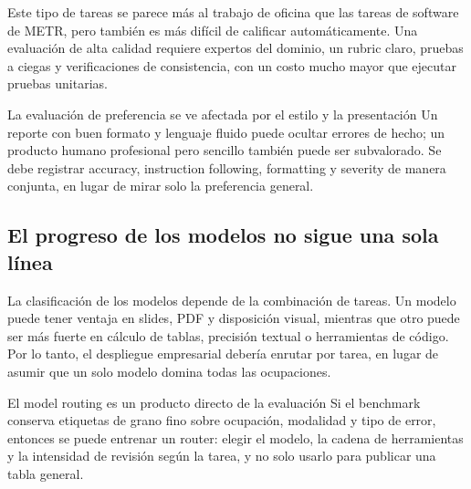 
Este tipo de tareas se parece más al trabajo de oficina que las tareas de software de METR, pero también es más difícil de calificar automáticamente. Una evaluación de alta calidad requiere expertos del dominio, un rubric claro, pruebas a ciegas y verificaciones de consistencia, con un costo mucho mayor que ejecutar pruebas unitarias.

\begin{warningbox}{La evaluación de preferencia se ve afectada por el estilo y la presentación}
Un reporte con buen formato y lenguaje fluido puede ocultar errores de hecho; un producto humano profesional pero sencillo también puede ser subvalorado. Se debe registrar accuracy, instruction following, formatting y severity de manera conjunta, en lugar de mirar solo la preferencia general.
\end{warningbox}

\subsection{El progreso de los modelos no sigue una sola línea}



La clasificación de los modelos depende de la combinación de tareas. Un modelo puede tener ventaja en slides, PDF y disposición visual, mientras que otro puede ser más fuerte en cálculo de tablas, precisión textual o herramientas de código. Por lo tanto, el despliegue empresarial debería enrutar por tarea, en lugar de asumir que un solo modelo domina todas las ocupaciones.

\begin{knowledgebox}{El model routing es un producto directo de la evaluación}
Si el benchmark conserva etiquetas de grano fino sobre ocupación, modalidad y tipo de error, entonces se puede entrenar un router: elegir el modelo, la cadena de herramientas y la intensidad de revisión según la tarea, y no solo usarlo para publicar una tabla general.
\end{knowledgebox}

